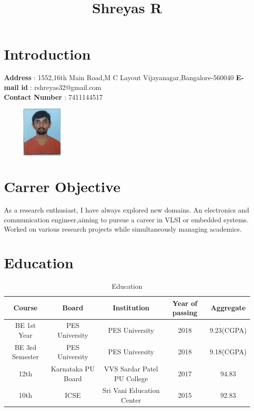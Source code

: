 \documentclass{article}
\title{\textbf{Shreyas R}}
\begin{document}
	\maketitle
	\hrulefill
	
	\section{Introduction}
	\begin{flushleft}
		\textbf{Address} : 1552,16th Main Road,M C Layout
		Vijayanagar,Bangalore-560040
		\textbf{E-mail id} : rshreyas32@gmail.com
		\\\textbf{Contact Number} : 7411144517
		\begin{figure}[!ht]
			\begin{flushright}
				\includegraphics[width=20mm]{image.jpeg}
			\end{flushright}
		\end{figure}
	\end{flushleft}

	\section{Carrer Objective}
	As a research enthusiast, I have always explored new domains. An electronics and communication engineer,aiming to pursue a career in VLSI or embedded systems. Worked on various research projects while simultaneously managing academics.
	
	\section{Education}
	\begin{table}[ht]
		\caption{Education}
		\centering
		\begin{tabular}{c c c c c}
			\hline\hline
			Course & Board & Institution & Year of passing & Aggregate \\[0.5ex]
			\hline
			BE 1st Year & PES University & PES University & 2018 & 9.23(CGPA) \\
			BE 3rd Semester & PES University & PES University & 2018 & 9.18(CGPA) \\
			12th & Karnataka PU Board & VVS Sardar Patel PU College  & 2017 & 94.83 \\
			10th & ICSE & Sri Vani Education Center & 2015 & 92.83 \\ 
			\hline
		\end{tabular}
		\label{table:nonlin}
	\end{table}
\end{document}
